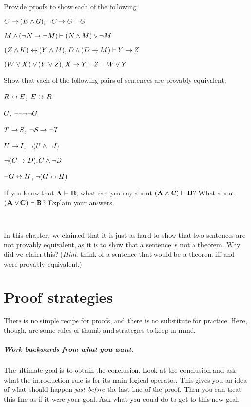 \problempart
Provide proofs to show each of the following:
\begin{earg}
\item $C\rightarrow(E\wedge G), \neg C \rightarrow G \vdash G$
\item $M \wedge (\neg N \rightarrow \neg M) \vdash (N \wedge M) \vee \neg M$
\item $(Z\wedge K)\leftrightarrow(Y\wedge M), D\wedge(D\rightarrow M) \vdash Y\rightarrow Z$
\item $(W \vee X) \vee (Y \vee Z), X\rightarrow Y, \neg Z \vdash W\vee Y$
\end{earg}

\problempart
Show that each of the following pairs of sentences are provably equivalent:
\begin{earg}
\item $R \leftrightarrow E$, $E \leftrightarrow R$
\item $G$, $\neg\neg\neg\neg G$
\item $T\rightarrow S$, $\neg S \rightarrow \neg T$
\item $U \rightarrow I$, $\neg(U \wedge \neg I)$
\item $\neg (C \rightarrow D), C \wedge \neg D$
\item $\neg G \leftrightarrow H$, $\neg(G \leftrightarrow H)$ 
\end{earg}

\problempart
If you know that $\mathbf{A}\vdash\mathbf{B}$, what can you say about $(\mathbf{A}\wedge\mathbf{C})\vdash\mathbf{B}$? What about $(\mathbf{A}\vee\mathbf{C})\vdash\mathbf{B}$? Explain your answers.

\

\problempart In this chapter, we claimed that it is just as hard to show that two sentences are not provably equivalent, as it is to show that a sentence is not a theorem. Why did we claim this? (\emph{Hint}: think of a sentence that would be a theorem iff  and  were provably equivalent.)





\chapter{Proof strategies}
There is no simple recipe for proofs, and there is no substitute for practice. Here, though, are some rules of thumb and strategies to keep in mind.

\paragraph{Work backwards from what you want.}
The ultimate goal is to obtain the conclusion. Look at the conclusion and ask what the introduction rule is for its main logical operator. This gives you an idea of what should happen \emph{just before} the last line of the proof. Then you can treat this line as if it were your goal. Ask what you could do to get to this new goal.


